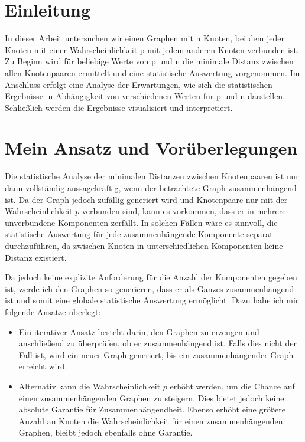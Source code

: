 %

\section{Einleitung}
In dieser Arbeit untersuchen wir einen Graphen mit n Knoten, bei dem jeder Knoten mit einer Wahrscheinlichkeit p mit jedem anderen Knoten verbunden ist. Zu Beginn wird für beliebige Werte von p und 
n die minimale Distanz zwischen allen Knotenpaaren ermittelt und eine statistische Auswertung vorgenommen. Im Anschluss erfolgt eine Analyse der Erwartungen, wie sich die statistischen Ergebnisse in Abhängigkeit von verschiedenen Werten für p und n darstellen. Schließlich werden die Ergebnisse visualisiert und interpretiert.


\section{Mein Ansatz und Vorüberlegungen}

Die statistische Analyse der minimalen Distanzen zwischen Knotenpaaren ist nur dann vollständig aussagekräftig, wenn der betrachtete Graph zusammenhängend ist. Da der Graph jedoch zufällig generiert wird und Knotenpaare nur mit der Wahrscheinlichkeit \( p \) verbunden sind, kann es vorkommen, dass er in mehrere unverbundene Komponenten zerfällt. In solchen Fällen wäre es sinnvoll, die statistische Auswertung für jede zusammenhängende Komponente separat durchzuführen, da zwischen Knoten in unterschiedlichen Komponenten keine Distanz existiert.

Da jedoch keine explizite Anforderung für die Anzahl der Komponenten gegeben ist, werde ich den Graphen so generieren, dass er als Ganzes zusammenhängend ist und somit eine globale statistische Auswertung ermöglicht. Dazu habe ich mir folgende Ansätze überlegt:

\begin{itemize}
    \item Ein iterativer Ansatz besteht darin, den Graphen zu erzeugen und anschließend zu überprüfen, ob er zusammenhängend ist. Falls dies nicht der Fall ist, wird ein neuer Graph generiert, bis ein zusammenhängender Graph erreicht wird.
    \item Alternativ kann die Wahrscheinlichkeit \( p \) erhöht werden, um die Chance auf einen zusammenhängenden Graphen zu steigern. Dies bietet jedoch keine absolute Garantie für Zusammenhängendheit. Ebenso erhöht eine größere Anzahl an Knoten die Wahrscheinlichkeit für einen zusammenhängenden Graphen, bleibt jedoch ebenfalls ohne Garantie.
\end{itemize}

